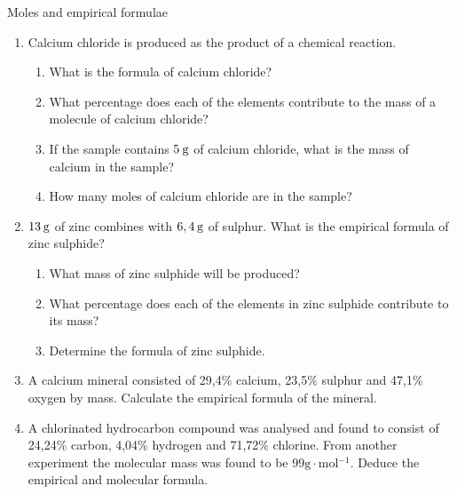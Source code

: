             \begin{exercises}{Moles and empirical formulae
      }
            \nopagebreak \noindent
      \label{m38712*id281924}\begin{enumerate}[noitemsep, label=\textbf{\arabic*}. ] 
            \label{m38712*uid73}\item Calcium chloride is produced as the product of a chemical reaction.
\label{m38712*id281940}\begin{enumerate}[noitemsep, label=\textbf{\alph*}. ] 
            \label{m38712*uid74}\item What is the formula of calcium chloride?
\label{m38712*uid75}\item What percentage does each of the elements contribute to the mass of a molecule of calcium chloride?
\label{m38712*uid76}\item If the sample contains $5\phantom{\rule{2pt}{0ex}}\text{g}$ of calcium chloride, what is the mass of calcium in the sample?
\label{m38712*uid77}\item How many moles of calcium chloride are in the sample?
\end{enumerate}
                \label{m38712*uid78}\item $13\phantom{\rule{2pt}{0ex}}\text{g}$ of zinc combines with $6,4\phantom{\rule{2pt}{0ex}}\text{g}$ of sulphur. What is the empirical formula of zinc sulphide?
\label{m38712*id282007}\begin{enumerate}[noitemsep, label=\textbf{\alph*}. ] 
            \label{m38712*uid79}\item What mass of zinc sulphide will be produced?
\label{m38712*uid80}\item What percentage does each of the elements in zinc sulphide contribute to its mass?
\label{m38712*uid81}\item Determine the formula of zinc sulphide.
\end{enumerate}
                \label{m38712*uid82}\item A calcium mineral consisted of 29,4\% calcium, 23,5\% sulphur and 47,1\% oxygen by mass. Calculate the empirical formula of the mineral.\newline
\label{m38712*uid83}\item A chlorinated hydrocarbon compound was analysed and found to consist of 24,24\% carbon, 4,04\% hydrogen and 71,72\% chlorine. From another experiment the molecular mass was found to be $99\text{g}\ensuremath{\cdot}\text{mol}{}^{-1}$. Deduce the empirical and molecular formula.\newline

\end{enumerate}
\end{exercises}
